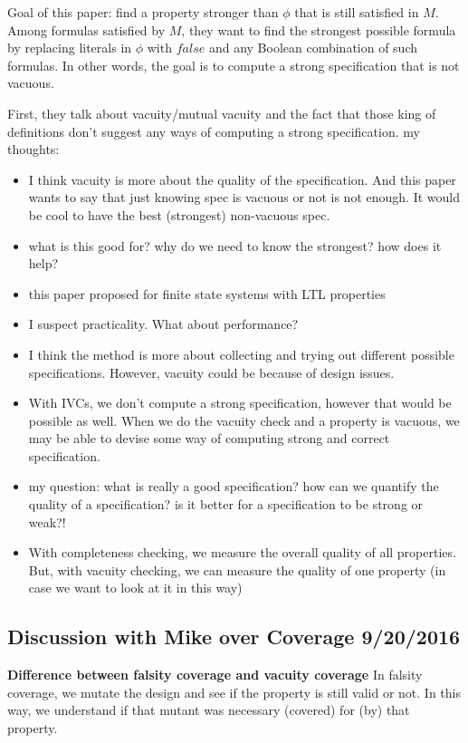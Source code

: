 Goal of this paper: find a property stronger than $\phi$ that is still satisfied in $M$.
Among formulas satisfied by $M$, they want to find the strongest possible formula by
replacing literals in $\phi$ with $false$ and any Boolean combination of such formulas.
In other words, the goal is to compute a strong specification that is not vacuous.

First, they talk about vacuity/mutual vacuity and the fact that those king of definitions
don't suggest any ways of computing a strong specification.
\linebreak
\linebreak
my thoughts:
\begin{itemize}
  \item I think vacuity is more about the quality of the specification. And this paper wants to
  say that just knowing spec is vacuous or not is not enough. It would be cool to have the best (strongest) non-vacuous spec.
  \item what is this good for? why do we need to know the strongest? how does it help?
  \item this paper proposed for finite state systems with LTL properties
  \item I suspect practicality. What about performance?
  \item I think the method is more about collecting and trying out different possible specifications. However, vacuity could be because of design issues.
  \item With IVCs, we don't compute a strong specification, however that would be possible as well. When we do the vacuity check and a property is vacuous,
      we may be able to devise some way of computing strong and correct specification.
  \item my question: what is really a good specification? how can we quantify the quality of a specification? is it better for a specification to be strong or weak?!
      \item With completeness checking, we measure the overall quality of all properties.
      But, with vacuity checking, we can measure the quality of one property (in case we want to look at it in this way)

\end{itemize}

\subsection{Discussion with Mike over Coverage 9/20/2016}
\textbf{Difference between falsity coverage and vacuity coverage}
In falsity coverage, we mutate the design and see if the property is still valid or not.
In this way, we understand if that mutant was necessary (covered) for (by) that property.

